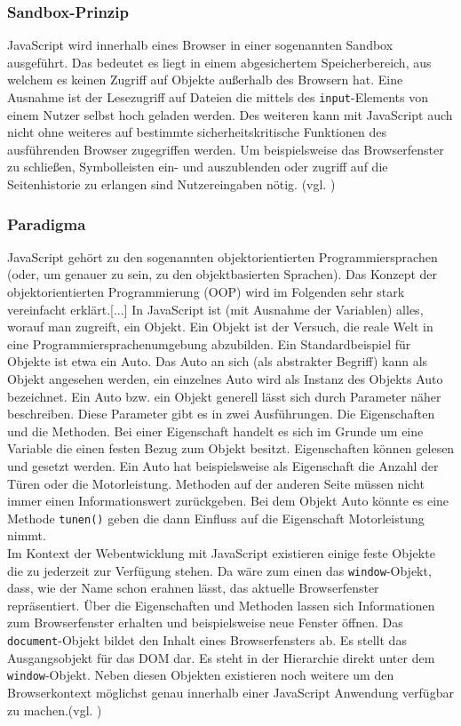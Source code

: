 \subsubsection{Sandbox-Prinzip} JavaScript wird innerhalb eines Browser in einer sogenannten Sandbox ausgeführt. Das bedeutet es liegt in einem abgesichertem Speicherbereich, aus welchem es keinen Zugriff auf Objekte außerhalb des Browsern hat. Eine Ausnahme ist der Lesezugriff auf Dateien die mittels des \texttt{input}-Elements von einem Nutzer selbst hoch geladen werden. Des weiteren kann mit JavaScript auch nicht ohne weiteres auf bestimmte sicherheitskritische Funktionen des ausführenden Browser zugegriffen werden. Um beispielsweise das Browserfenster zu schließen, Symbolleisten ein- und auszublenden oder zugriff auf die Seitenhistorie zu erlangen sind Nutzereingaben nötig. (vgl. \cite{WikiJS2014})

\subsubsection{Paradigma} \glqq JavaScript gehört zu den sogenannten objektorientierten Programmiersprachen (oder, um genauer zu sein, zu den objektbasierten Sprachen). Das Konzept der objektorientierten Programmierung (OOP) wird im Folgenden sehr stark vereinfacht erklärt.[...] In JavaScript ist (mit Ausnahme der Variablen) alles, worauf man zugreift, ein Objekt. Ein Objekt ist der Versuch, die reale Welt in eine Programmiersprachenumgebung abzubilden. Ein Standardbeispiel für Objekte ist etwa ein Auto. Das Auto an sich (als abstrakter Begriff) kann als Objekt angesehen werden, ein einzelnes Auto wird als Instanz des Objekts Auto bezeichnet.\grqq{}\cite[S.93]{WenzJava2008} Ein Auto bzw. ein Objekt generell lässt sich durch Parameter näher beschreiben. Diese Parameter gibt es in zwei Ausführungen. Die Eigenschaften und die Methoden. Bei einer Eigenschaft handelt es sich im Grunde um eine Variable die einen festen Bezug zum Objekt besitzt. Eigenschaften können gelesen und gesetzt werden. Ein Auto hat beispielsweise als Eigenschaft die Anzahl der Türen oder die Motorleistung. Methoden auf der anderen Seite müssen nicht immer einen Informationswert zurückgeben. Bei dem Objekt Auto könnte es eine Methode \texttt{tunen()} geben die dann Einfluss auf die Eigenschaft Motorleistung nimmt.\\Im Kontext der Webentwicklung mit JavaScript existieren einige feste Objekte die zu jederzeit zur Verfügung stehen. Da wäre zum einen das \texttt{window}-Objekt, dass, wie der Name schon erahnen lässt, das aktuelle Browserfenster repräsentiert. Über die Eigenschaften und Methoden lassen sich Informationen zum Browserfenster erhalten und beispielsweise neue Fenster öffnen. Das \texttt{document}-Objekt bildet den Inhalt eines Browserfensters ab. Es stellt das Ausgangsobjekt für das DOM dar. Es steht in der Hierarchie direkt unter dem \texttt{window}-Objekt. Neben diesen Objekten existieren noch weitere um den Browserkontext möglichst genau innerhalb einer JavaScript Anwendung verfügbar zu machen.(vgl. \cite{SelfHtml20147})

